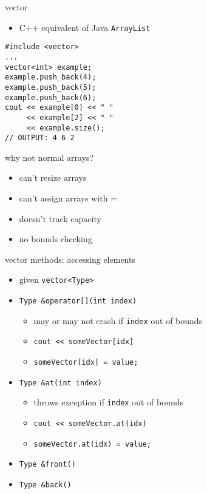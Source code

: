 \begin{frame}[fragile,label=vectorIntro]{vector}
\lstset{language=C++,style=small}
\begin{itemize}
\item C++ equivalent of Java \texttt{ArrayList}
\end{itemize}
\begin{lstlisting}
#include <vector>
...
vector<int> example;
example.push_back(4);
example.push_back(5);
example.push_back(6);
cout << example[0] << " "
     << example[2] << " "
     << example.size();
// OUTPUT: 4 6 2
\end{lstlisting}
\end{frame}

\begin{frame}{why not normal arrays?}
\begin{itemize}
\item can't resize arrays
\item can't assign arrays with =
\item doesn't track capacity
\item no bounds checking
\end{itemize}
\end{frame}

\begin{frame}[fragile,label=vectMeth]{vector methods: accessing elements}
\lstset{
    language=C++,
    style=small
}
\begin{itemize}
\item given \lstinline|vector<Type>|
\item \lstinline|Type &operator[](int index)|
    \begin{itemize}
    \item may or may not crash if \lstinline|index| out of bounds
    \item \lstinline|cout << someVector[idx]|
    \item \lstinline|someVector[idx] = value;|
    \end{itemize}
\item \lstinline|Type &at(int index)|
    \begin{itemize}
        \item throws exception if \lstinline|index| out of bounds
        \item \lstinline|cout << someVector.at(idx)|
        \item \lstinline|someVector.at(idx) = value;|
    \end{itemize}
\item \lstinline|Type &front()|
\item \lstinline|Type &back()|
\end{itemize}
\end{frame}

